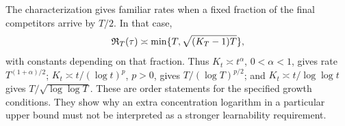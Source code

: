 The characterization gives familiar rates when a fixed fraction of the final competitors arrive by $T/2$. In that case,
\[
 \mathfrak R_T(\tau)\asymp\min\{T,\sqrt{(K_T-1)T}\},
\]
with constants depending on that fraction. Thus $K_t\asymp t^\alpha$, $0<\alpha<1$, gives rate $T^{(1+\alpha)/2}$; $K_t\asymp t/(\log t)^p$, $p>0$, gives $T/(\log T)^{p/2}$; and $K_t\asymp t/\log\log t$ gives $T/\sqrt{\log\log T}$. These are order statements for the specified growth conditions. They show why an extra concentration logarithm in a particular upper bound must not be interpreted as a stronger learnability requirement.
